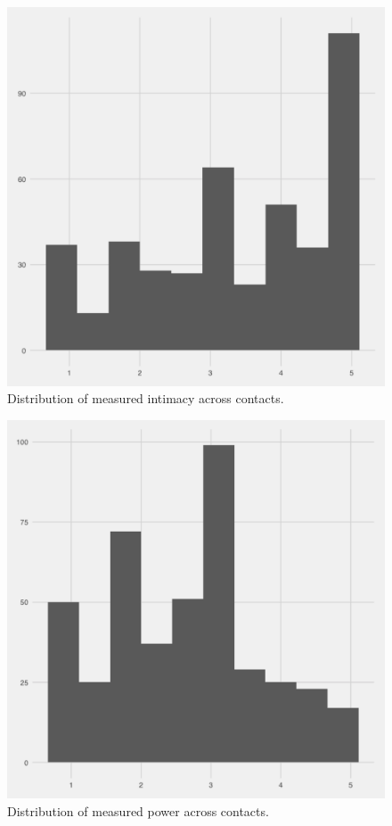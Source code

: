 \documentclass[12pt]{nuthesis}	%
\begin{document}
\begin{figure}[h]
\centering
\includegraphics[width=.7\textwidth]{figures/intimacy_distribution}
\caption{Distribution of measured intimacy across contacts.}
\label{fig:intimacy}
\end{figure}


\begin{figure}[h]
\centering
\includegraphics[width=.7\textwidth]{figures/power_distribution}
\caption{Distribution of measured power across contacts.}
\label{fig:power}
\end{figure}
\end{document}
